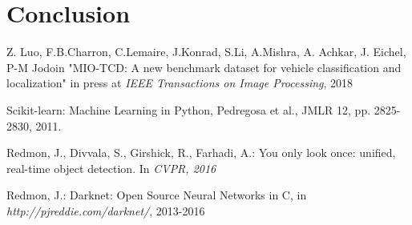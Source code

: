 \documentclass[12pt]{article}
\begin{document}
\section{Conclusion}

\newpage

\begin{thebibliography}{50}

Z. Luo, F.B.Charron, C.Lemaire, J.Konrad, S.Li, A.Mishra, A. Achkar, J. Eichel, P-M Jodoin "MIO-TCD: A new benchmark dataset for vehicle classification and localization" in press at \textit{IEEE Transactions on Image Processing}, 2018

Scikit-learn: Machine Learning in Python, Pedregosa et al., JMLR 12, pp. 2825-2830, 2011.

Redmon, J., Divvala, S., Girshick, R., Farhadi, A.: You only look once: unified, real-time object detection. In \textit{CVPR, 2016}

Redmon, J.: Darknet: Open Source Neural Networks in C, in \textit{http://pjreddie.com/darknet/}, 2013-2016


\end{thebibliography}

\newpage

\setcounter{section}{0}
\end{document}
